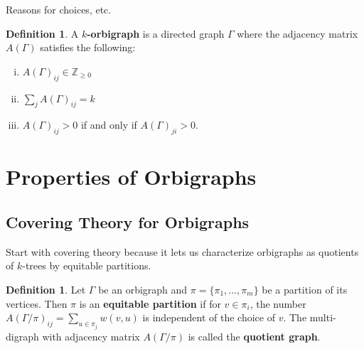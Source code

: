 \documentclass[12pt]{article}
\theoremstyle{plain}
\theoremstyle{definition}
\newtheorem{definition}[theorem]{Definition}
\theoremstyle{remark}
\begin{document}
  Reasons for choices, etc.

  \begin{definition}\label{def:OrbigraphDefn}
    A \textbf{$k$-orbigraph} is a directed graph $\Gamma$ where the adjacency matrix $A(\Gamma)$ satisfies the following:
    
    \begin{enumerate}[i.]
      \item $A(\Gamma)_{ij} \in \mathbb{Z}_{\ge 0}$
      \item $\sum_j A(\Gamma)_{ij} = k$
      \item $A(\Gamma)_{ij} > 0$ if and only if $A(\Gamma)_{ji} > 0$.
    \end{enumerate}

  \end{definition}


\section{Properties of Orbigraphs}


  \subsection{Covering Theory for Orbigraphs}

    Start with covering theory because it lets us characterize orbigraphs as quotients of $k$-trees by equitable partitions.

    \begin{definition}\label{def:EqPartitionDefn}
      Let $\Gamma$ be an orbigraph and $\pi = \{ \pi_1, \ldots, \pi_m \}$ be a partition of its vertices. Then $\pi$ is an \textbf{equitable partition} if for $v \in \pi_i$, the number $A(\Gamma / \pi)_{ij} = \sum_{u \in \pi_j} w(v, u)$ is independent of the choice of $v$. The multi-digraph with adjacency matrix $A(\Gamma / \pi)$ is called the \textbf{quotient graph}.
    \end{definition}
\end{document}

